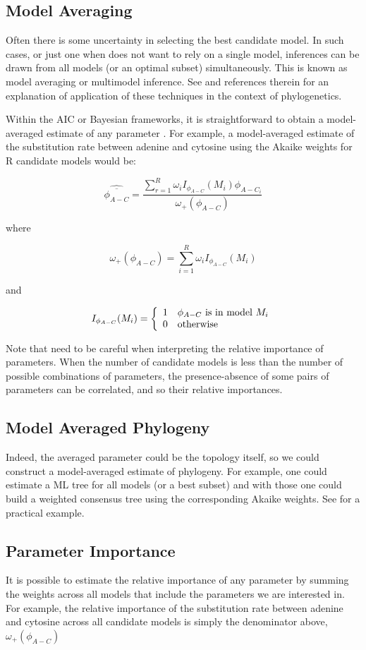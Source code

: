\subsection{Model Averaging}
\label{sec:model-averaging}

Often there is some uncertainty in selecting the best candidate model. In such cases, or just one when does not want to rely on a single model, inferences can be drawn from all models (or an optimal subset) simultaneously. This is known as model averaging or multimodel inference. See \citet{Posada-2004} and references therein for an explanation of application of these techniques in the context of phylogenetics.

Within the AIC or Bayesian frameworks, it is straightforward to obtain a model-averaged estimate of any parameter \citep{Madigan-1994, Raftery-1996, Hoeting-1999, Wasserman-2000, Burnham-2003, Posada-2003}. For example, a model-averaged estimate of the substitution rate between adenine and cytosine using the Akaike weights for R candidate models would be:

\[
\widehat{\overline{\phi_{A-C}}} = \frac{\sum_{r=1}^R \omega_i I_{\phi_{A-C}}(M_i) \phi_{A-C_i}}{\omega_+(\phi_{A-C})}
\]

where

\[
\omega_+(\phi_{A-C}) = \sum_{i=1}^R \omega_i I_{\phi_{A-C}}(M_i)
\]

and

\[
I_{\phi_{A-C}}(M_i) = \left\{ 
\begin{array}{c l}
1 &  \mbox{$\phi_{A-C}$ is in model $M_i$}\\
0 & \mbox{otherwise}
\end{array}
\right.
\]

Note that need to be careful when interpreting the relative importance of parameters. When the number of candidate models is less than the number of possible combinations of parameters, the presence-absence of some pairs of parameters can be correlated, and so their relative importances.

\subsection{Model Averaged Phylogeny}
\label{sec:consensus}

Indeed, the averaged parameter could be the topology itself, so we could construct a model-averaged estimate of phylogeny. For example, one could estimate a ML tree for all models (or a best subset) and with those one could build a weighted consensus tree using the corresponding Akaike weights. See \citet{Posada-2004} for a practical example.

\subsection{Parameter Importance}
\label{sec:param-importances}

It is possible to estimate the relative importance of any parameter by summing the weights across all models that include the parameters we are interested in. For example, the relative importance of the substitution rate between adenine and cytosine across all candidate models is simply the denominator above, $\omega_+(\phi_{A-C})$

